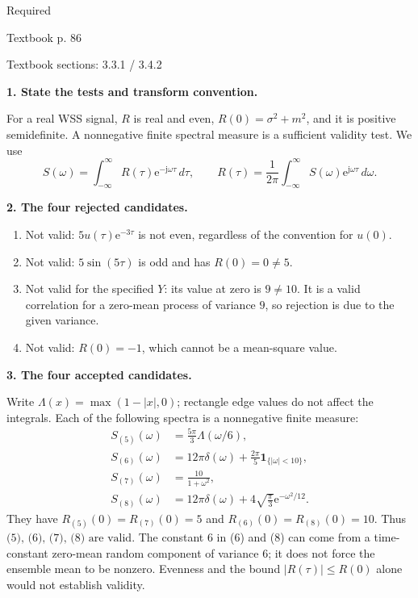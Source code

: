 \documentclass[11pt]{article}
\newcommand{\jj}{\mathrm j}\newcommand{\ee}{\mathrm e}
\newcommand{\problem}[3]{\par\addvspace{1em}\Needspace{8\baselineskip}{\LARGE\bfseries Exercise #1}\hfill #2\par{\small\color{gray}Textbook p. #3}\par\vspace{3mm}}
\newcommand{\step}[1]{\par\Needspace{6\baselineskip}\textbf{#1}\par}
\begin{document}
\problem{3.14}{Required}{86}
{\small Textbook sections: 3.3.1 / 3.4.2}
\step{1. State the tests and transform convention.}
For a real WSS signal, $R$ is real and even, $R(0)=\sigma^2+m^2$, and it is positive semidefinite. A nonnegative finite spectral measure is a sufficient validity test. We use
\[S(\omega)=\int_{-\infty}^{\infty}R(\tau)\ee^{-\jj\omega\tau}\,d\tau,
\qquad R(\tau)=\frac1{2\pi}\int_{-\infty}^{\infty}S(\omega)\ee^{\jj\omega\tau}\,d\omega.\]
\step{2. The four rejected candidates.}
\begin{enumerate}
\item Not valid: $5u(\tau)\ee^{-3\tau}$ is not even, regardless of the convention for $u(0)$.
\item Not valid: $5\sin(5\tau)$ is odd and has $R(0)=0\ne5$.
\item Not valid for the specified $Y$: its value at zero is $9\ne10$. It is a valid correlation for a zero-mean process of variance $9$, so rejection is due to the given variance.
\item Not valid: $R(0)=-1$, which cannot be a mean-square value.
\end{enumerate}
\step{3. The four accepted candidates.}
Write $\Lambda(x)=\max(1-|x|,0)$; rectangle edge values do not affect the integrals. Each of the following spectra is a nonnegative finite measure:
\[\begin{aligned}
S_{(5)}(\omega)&=\frac{5\pi}{3}\Lambda(\omega/6),\\
S_{(6)}(\omega)&=12\pi\delta(\omega)+\frac{2\pi}{5}\mathbf1_{\{|\omega|<10\}},\\
S_{(7)}(\omega)&=\frac{10}{1+\omega^2},\\
S_{(8)}(\omega)&=12\pi\delta(\omega)+4\sqrt{\frac\pi3}\ee^{-\omega^2/12}.
\end{aligned}\]
They have $R_{(5)}(0)=R_{(7)}(0)=5$ and $R_{(6)}(0)=R_{(8)}(0)=10$. Thus $\boxed{\text{(5), (6), (7), (8) are valid.}}$
The constant $6$ in (6) and (8) can come from a time-constant zero-mean random component of variance $6$; it does not force the ensemble mean to be nonzero. Evenness and the bound $|R(\tau)|\le R(0)$ alone would not establish validity.
\end{document}
